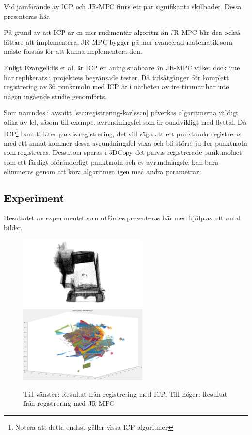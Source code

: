 Vid jämförande av ICP och JR-MPC finns ett par signifikanta skillnader. Dessa presenteras här.

På grund av att ICP är en mer rudimentär algoritm än JR-MPC blir den också lättare att implementera. JR-MPC bygger på mer avancerad matematik som måste förstås för att kunna implementera den.

Enligt Evangelidis et al. \cite{Evangelidis-ECCV-2014} är ICP en aning snabbare än JR-MPC vilket dock inte har replikerats i projektets begränsade tester. Då tidsåtgången för komplett registrering av 36 punktmoln med ICP är i närheten av tre timmar har inte någon ingående studie genomförts. 

Som nämndes i avsnitt \ref{sec:registrering-karlsson} påverkas algoritmerna väldigt olika av fel, såsom till exempel avrundningsfel som är oundvikligt med flyttal. Då ICP\footnote{Notera att detta endast gäller vissa ICP algoritmer} bara tillåter parvis registrering, det vill säga att ett punktmoln registreras med ett annat kommer dessa avrundningsfel växa och bli större ju fler punktmoln som registreras. Dessutom sparas i 3DCopy det parvis registrerade punktmolnet som ett färdigt oföränderligt punktmoln och ev avrundningsfel kan bara elimineras genom att köra algoritmen igen med andra parametrar.

\subsection{Experiment}

Resultatet av experimentet som utfördes presenteras här med hjälp av ett antal bilder.  

\begin{figure}[H]
	\centering
	\includegraphics[width=65mm]{figures/first_registered_church.png}
	\includegraphics[width=65mm]{figures/JRMPC_result.png}
	\caption{Till vänster: Resultat från registrering med ICP, Till höger: Resultat från registrering med JR-MPC}
	\label{fig:icp_vs_jrmpc_result}
\end{figure}

